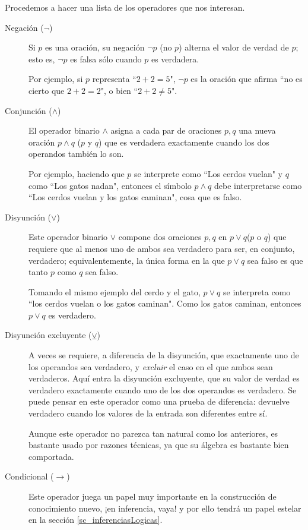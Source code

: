 \documentclass{book}
\theoremstyle{definition}
\begin{document}
Procedemos a hacer una lista de los operadores que nos interesan.
\begin{description}
	\item [Negación ($\neg$)]  %
	Si $p$ es una oración, su negación $\neg p$ (no $p$) alterna el valor de verdad de $p$; esto es, $\neg p$ es falsa sólo cuando $p$ es verdadera.
	
	Por ejemplo, si $p$ representa ``$2+2=5$", $\neg p$ es la oración que afirma ``no es cierto que $2+2=2$", o bien ``$2+2\neq 5$".

	\item[Conjunción ($\wedge$)] El operador binario $\wedge$ asigna a cada par de oraciones $p,q$ una nueva oración $p \wedge q$ ($p$ y $q$) que es verdadera exactamente cuando los dos operandos también lo son.

	Por ejemplo, haciendo que $p$ se interprete como ``Los cerdos vuelan" y $q$ como ``Los gatos nadan", entonces el símbolo $p\wedge q$ debe interpretarse como ``Los cerdos vuelan y los gatos caminan", cosa que es falso.
	
	\item[Disyunción ($\vee$)] Este operador binario $\vee$ compone dos oraciones $p,q$ en $p\vee q$($p$ o $q$) que requiere que al menos uno de ambos sea verdadero para ser, en conjunto, verdadero; equivalentemente, la única forma en la que $p \vee q$ sea falso es que tanto $p$ como $q$ sea falso.
	
	Tomando el mismo ejemplo del cerdo y el gato, $p\vee q$ se interpreta como ``los cerdos vuelan o los gatos caminan". Como los gatos caminan, entonces $p \vee q$ es verdadero.
	
	\item[Disyunción excluyente ($\veebar$)] A veces se requiere, a diferencia de la disyunción, que exactamente uno de los operandos sea verdadero, y \emph{excluir} el caso en el que ambos sean verdaderos. Aquí entra la disyunción excluyente, que su valor de verdad es verdadero exactamente cuando uno de los dos operandos es verdadero.
	Se puede pensar en este operador como una prueba de diferencia: devuelve verdadero cuando los valores de la entrada son diferentes entre sí.
	
	Aunque este operador no parezca tan natural como los anteriores, es bastante usado por razones técnicas, ya que su álgebra es bastante bien comportada. %
	
	\item[Condicional ($\rightarrow$)] Este operador juega un papel muy importante en la construcción de conocimiento nuevo, ¡en inferencia, vaya! y por ello tendrá un papel estelar en la sección \ref{sc_inferenciasLogicas}.
	

\end{description}
\end{document}

